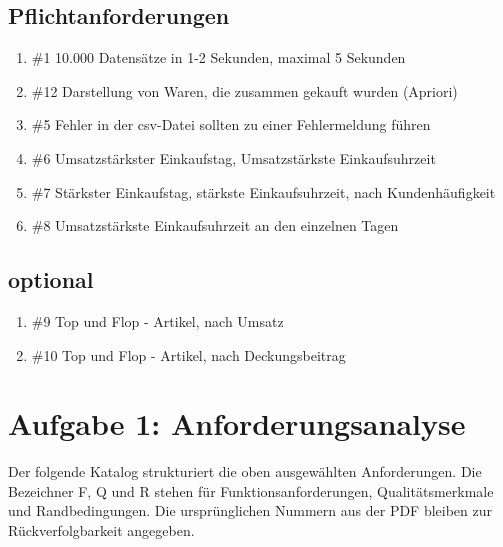 \documentclass[a4paper,10pt]{article}
\begin{document}
        \subsection*{Pflichtanforderungen}
        \begin{enumerate}
            \item \#1 10.000 Datensätze in 1-2 Sekunden, maximal 5 Sekunden
            \item \#12 Darstellung von Waren, die zusammen gekauft wurden (Apriori)
            \item \#5 Fehler in der csv-Datei sollten zu einer Fehlermeldung führen
            \item \#6 Umsatzstärkster Einkaufstag, Umsatzstärkste Einkaufsuhrzeit
            \item \#7 Stärkster Einkaufstag, stärkste Einkaufsuhrzeit, nach Kundenhäufigkeit
            \item \#8 Umsatzstärkste Einkaufsuhrzeit an den einzelnen Tagen
        \end{enumerate}

        \subsection*{optional}
        \begin{enumerate}
            \item \#9 Top und Flop - Artikel, nach Umsatz
            \item \#10 Top und Flop - Artikel, nach Deckungsbeitrag
        \end{enumerate}

        \clearpage


        \section*{Aufgabe 1: Anforderungsanalyse}

        Der folgende Katalog strukturiert die oben ausgewählten Anforderungen. Die Bezeichner F, Q und R stehen für Funktionsanforderungen, Qualitätsmerkmale und Randbedingungen. Die ursprünglichen Nummern aus der PDF bleiben zur Rückverfolgbarkeit angegeben.
\end{document}
